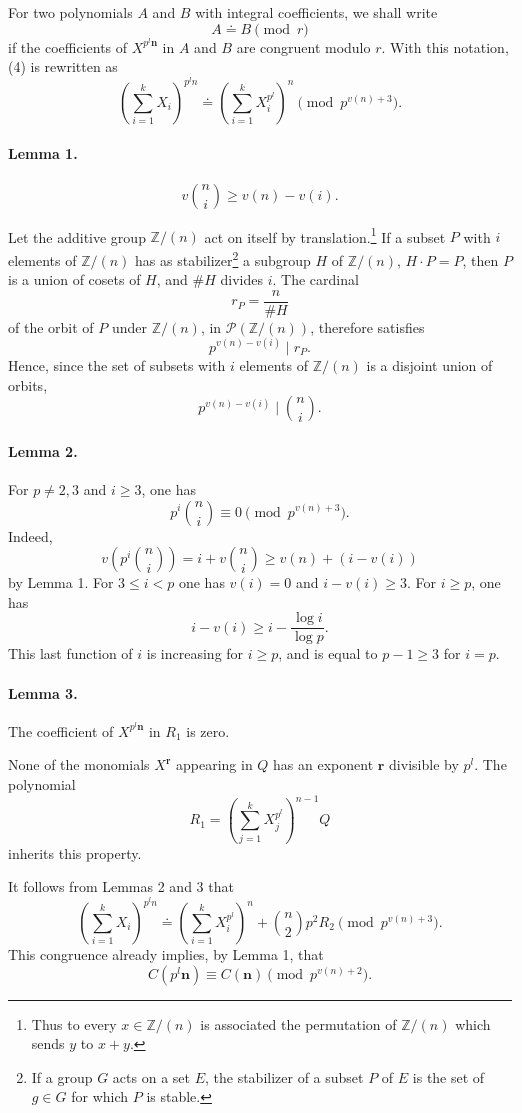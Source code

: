 \documentclass[10pt]{article}
\newcommand{\Z}{\mathbb Z}
\newcommand{\dd}{\mathrel{\doteq}}
\newcommand{\nn}{\mathbf n}
\newcommand{\rr}{\mathbf r}
\begin{document}
For two polynomials $A$ and $B$ with integral coefficients, we shall write
\[
A\dd B \pmod r
\]
if the coefficients of $X^{p^l\nn}$ in $A$ and $B$ are congruent modulo $r$. With this notation, (4) is rewritten as
\[
\left(\sum_{i=1}^k X_i\right)^{p^l n}
\dd
\left(\sum_{i=1}^k X_i^{p^l}\right)^n
\pmod {p^{v(n)+3}}. \tag{8}
\]

\paragraph{Lemma 1.}
\[
v\binom ni \ge v(n)-v(i). \tag{9}
\]

Let the additive group $\Z/(n)$ act on itself by translation.\footnote{Thus to every $x\in\Z/(n)$ is associated the permutation of $\Z/(n)$ which sends $y$ to $x+y$.} If a subset $P$ with $i$ elements of $\Z/(n)$ has as stabilizer\footnote{If a group $G$ acts on a set $E$, the stabilizer of a subset $P$ of $E$ is the set of $g\in G$ for which $P$ is stable.} a subgroup $H$ of $\Z/(n)$, $H\cdot P=P$, then $P$ is a union of cosets of $H$, and $\#H$ divides $i$. The cardinal
\[
r_P=\frac{n}{\#H}
\]
of the orbit of $P$ under $\Z/(n)$, in $\mathcal P(\Z/(n))$, therefore satisfies
\[
p^{v(n)-v(i)}\mid r_P.
\]
Hence, since the set of subsets with $i$ elements of $\Z/(n)$ is a disjoint union of orbits,
\[
p^{v(n)-v(i)}\mid\binom ni.
\]

\paragraph{Lemma 2.} For $p\ne2,3$ and $i\ge3$, one has
\[
p^i\binom ni\equiv0\pmod {p^{v(n)+3}}. \tag{10}
\]
Indeed,
\[
v\left(p^i\binom ni\right)
=i+v\binom ni
\ge v(n)+(i-v(i))
\]
by Lemma 1. For $3\le i<p$ one has $v(i)=0$ and $i-v(i)\ge3$. For $i\ge p$, one has
\[
i-v(i)\ge i-\frac{\log i}{\log p}.
\]
This last function of $i$ is increasing for $i\ge p$, and is equal to $p-1\ge3$ for $i=p$.

\paragraph{Lemma 3.} The coefficient of $X^{p^l\nn}$ in $R_1$ is zero.

None of the monomials $X^\rr$ appearing in $Q$ has an exponent $\rr$ divisible by $p^l$. The polynomial
\[
R_1=\left(\sum_{j=1}^k X_j^{p^l}\right)^{n-1}Q
\]
inherits this property.

It follows from Lemmas 2 and 3 that
\[
\left(\sum_{i=1}^k X_i\right)^{p^l n}
\dd
\left(\sum_{i=1}^k X_i^{p^l}\right)^n
+\binom n2 p^2R_2
\pmod {p^{v(n)+3}}. \tag{11}
\]
This congruence already implies, by Lemma 1, that
\[
C(p^l\nn)\equiv C(\nn)\pmod {p^{v(n)+2}}. \tag{12}
\]
\end{document}
